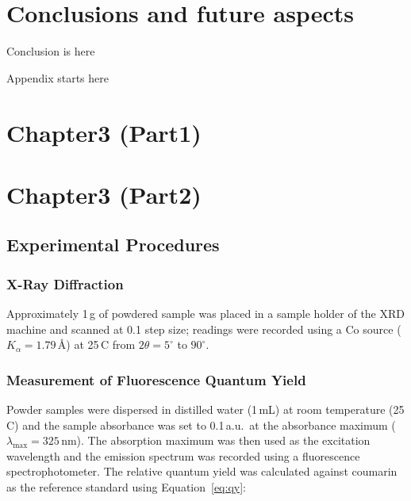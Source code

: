 \newpage
\null
\thispagestyle{empty}
\newpage
\chapter{Conclusions and future aspects}
Conclusion is here

\appendix
Appendix starts here

\chapter{Chapter3 (Part1)}

\newpage
\null
\thispagestyle{empty}
\newpage
\chapter{Chapter3 (Part2)}

\section*{Experimental Procedures}

\subsection*{X-Ray Diffraction}
Approximately 1\,g of powdered sample was placed in a sample holder of the XRD machine
and scanned at 0.1 step size; readings were recorded using a Co source
($K_{\alpha} = 1.79$\,\AA) at 25\,\textdegree C from $2\theta = 5^{\circ}$ to
$90^{\circ}$.

\subsection*{Measurement of Fluorescence Quantum Yield}
Powder samples were dispersed in distilled water (1\,mL) at room temperature
(25\,\textdegree C) and the sample absorbance was set to 0.1\,a.u.\ at the absorbance
maximum ($\lambda_{\max} = 325$\,nm). The absorption maximum was then used as the
excitation wavelength and the emission spectrum was recorded using a fluorescence
spectrophotometer. The relative quantum yield was calculated against coumarin as the
reference standard using Equation~\ref{eq:qy}:


